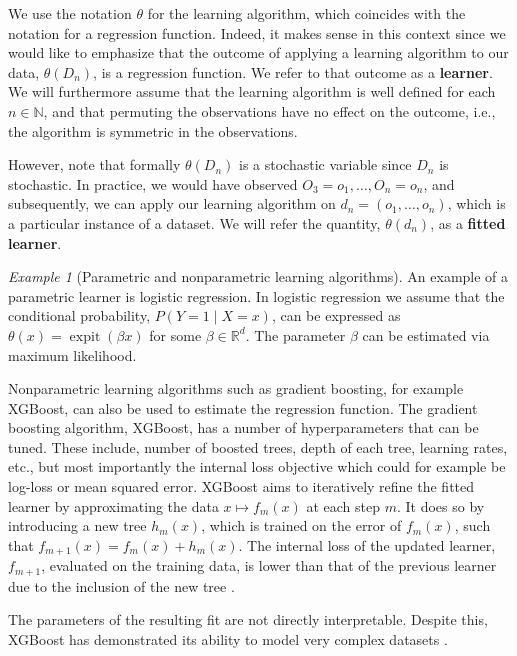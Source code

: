 \documentclass[11pt, a4paper]{article}
\theoremstyle{definition}
\theoremstyle{remark}
\newtheorem{example}{Example}
\newcommand{\btheta}{\theta}
\DeclareMathOperator{\expit}{expit}
\begin{document}
We use the notation $ \btheta $ for the learning algorithm, which coincides with the notation for a regression function. Indeed, it makes sense in this context since we would like to emphasize that the outcome of applying a learning algorithm to our data, $\btheta(D_n) $, is a regression function. We refer to that outcome as a \textbf{learner}. We will furthermore assume that the learning algorithm is well defined for each $ n \in \mathbb{N} $, and that permuting the observations have no effect on the outcome, i.e., the algorithm is symmetric in the observations.  

However, note that formally $ \btheta(D_n) $ is a stochastic variable since $ D_n $ is stochastic. In practice, we would have observed $ O_3 = o_1, \dots, O_n = o_n $, and subsequently, we can apply our learning algorithm on $ d_n = (o_1 , \dots , o_n) $, which is a particular instance of a dataset. We will refer the quantity, $ \btheta(d_n) $, as a \textbf{fitted learner}. 
\begin{example}[Parametric and nonparametric learning algorithms]
    An example of a parametric learner is logistic regression. In logistic regression we assume that the conditional probability, $ P(Y = 1 \mid X = x) $, can be expressed as $ \btheta(x) = \expit( \beta x) $ for some $ \beta \in \mathbb{R}^{d} $. The parameter $ \beta $ can be estimated via maximum likelihood.   

Nonparametric learning algorithms such as gradient boosting, for example XGBoost, can also be used to estimate the regression function. The gradient boosting algorithm, XGBoost, has a number of hyperparameters that can be tuned. These include, number of boosted trees, depth of each tree, learning rates, etc., but most importantly the internal loss objective which could for example be log-loss or mean squared error. XGBoost aims to iteratively refine the fitted learner by approximating the data $x \mapsto f_m(x)$ at each step $m$. It does so by introducing a new tree $h_m(x)$, which is trained on the error of $ f_m(x)$, such that $f_{m + 1}(x) = f_m(x) + h_m(x)$. The internal loss of the updated learner, $f_{m + 1}$, evaluated on the training data, is lower than that of the previous learner due to the inclusion of the new tree \parencite{chen2016xgboost}.

The parameters of the resulting fit are not directly interpretable. Despite this, XGBoost has demonstrated its ability to model very complex datasets \parencite{chen2016xgboost}.

\end{example}
\end{document}
